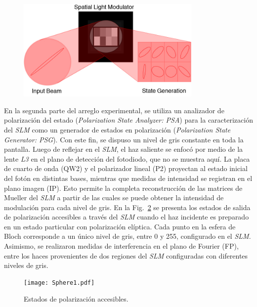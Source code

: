 \begin{figure}[htp]
\centering
\includegraphics[width=0.8\textwidth]{SLM.jpg}
\caption{{\color{red} }} 
\label{fig:schematic-codification}
\end{figure}



En la segunda parte del arreglo experimental, se utiliza un analizador de polarización del estado ({\it Polarization State Analyzer: PSA})
para la caracterización del {\it SLM}
como un generador de estados en polarización ({\it Polarization State Generator: PSG}). 
Con este fin, se dispuso un nivel de gris constante en toda la pantalla. Luego de reflejar en el {\it SLM}, el haz saliente se enfocó por medio de la lente {\it L3} 
en el plano de detección del fotodiodo,
que no se muestra aquí. %
La placa de cuarto de onda (QW2) 
y el polarizador lineal (P2) 
proyectan al estado inicial del fotón 
en distintas bases, mientras que medidas de intensidad se registran en el plano imagen (IP). Esto permite la completa reconstrucción de las matrices de Mueller 
del {\it SLM} a partir de las cuales se puede obtener la intensidad de modulación para cada nivel de gris.
En la Fig.~\ref{fig:sphere} 
se presenta los estados de salida de polarización
accesibles a través del {\it SLM}
cuando el haz incidente es preparado en un estado particular con polarización elíptica.
Cada punto en la esfera de
Bloch corresponde a un único nivel de gris, entre 0 y 255, configurado en el {\it SLM}.
Asimismo, se realizaron medidas de interferencia en el plano de Fourier (FP), 
entre los haces provenientes de dos regiones del {\it SLM}
configuradas con diferentes niveles de gris. %

\begin{figure}[htp]
\centering
\texttt{[image: Sphere1.pdf]}
\caption{Estados de polarización accesibles.}
\label{fig:sphere}
\end{figure}

